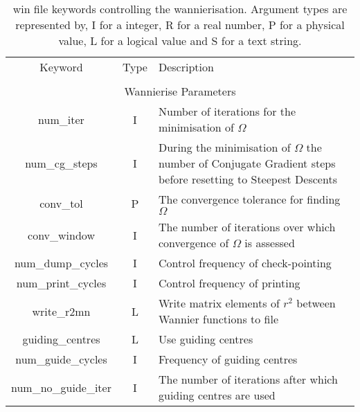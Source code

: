 \begin{table}
\begin{center}
\begin{tabular}{|c|c|p{6cm}|}
\hline
Keyword & Type & Description \\
        &      &             \\
\hline\hline
\multicolumn{3}{|c|}{Wannierise Parameters} \\
\hline
{\sc num\_iter }   & I & Number of iterations for the minimisation
of $\Omega$ \\
{\sc num\_cg\_steps }   & I & During the minimisation
of $\Omega$ the number of Conjugate Gradient steps before resetting to
Steepest Descents \\
{\sc conv\_tol }   & P &The convergence tolerance for finding $\Omega$  \\
{\sc conv\_window }   & I & The number of iterations over which
convergence of $\Omega$ is assessed \\
{\sc num\_dump\_cycles }   & I & Control frequency of check-pointing \\
{\sc num\_print\_cycles }   & I & Control frequency of printing \\
{\sc write\_r2mn }   & L & Write matrix elements of $r^2$ between
Wannier functions to file \\
{\sc guiding\_centres }   & L & Use guiding centres \\
{\sc num\_guide\_cycles }   & I & Frequency of guiding centres \\
{\sc num\_no\_guide\_iter }   & I & The number of iterations
after which guiding centres are used\\
\hline
\end{tabular}
\caption[Parameter file keywords controlling the Wannierise routine.]
{win file keywords controlling the wannierisation.  Argument types
are represented by, I for a integer, R for a real number, P for a
physical value, L for a logical value and S for a text string.}
\label{parameter_keywords5}
\end{center}
\end{table}



